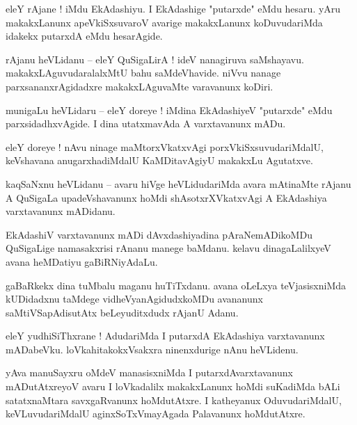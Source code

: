 \documentclass{article}
\begin{document}
\begin{mn}%
eleY rAjane ! iMdu EkAdashiyu. I EkAdashige "putarxde" eMdu hesaru. yAru makakxLanunx 
apeVkiSxsuvaroV avarige makakxLanunx koDuvudariMda idakekx putarxdA eMdu hesarAgide.
\end{mn}

\begin{mn}%
rAjanu heVLidanu -- eleY QuSigaLirA ! ideV nanagiruva saMshayavu. makakxLAguvudaralalxMtU bahu 
saMdeVhavide. niVvu nanage parxsananxrAgidadxre makakxLAguvaMte varavanunx koDiri.
\end{mn}

\begin{mn}%
munigaLu heVLidaru -- eleY doreye ! iMdina EkAdashiyeV "putarxde" eMdu parxsidadhxvAgide. I dina 
utatxmavAda A varxtavanunx mADu.
\end{mn}

\begin{mn}%
eleY doreye ! nAvu ninage maMtorxVkatxvAgi porxVkiSxsuvudariMdalU, keVshavana anugarxhadiMdalU 
KaMDitavAgiyU makakxLu Agutatxve.
\end{mn}

\begin{mn}%
kaqSaNxnu heVLidanu -- avaru hiVge heVLidudariMda avara mAtinaMte rAjanu A QuSigaLa upadeVshavanunx 
hoMdi shAsotxrXVkatxvAgi A EkAdashiya varxtavanunx mADidanu.
\end{mn}

\begin{mn}%
EkAdashiV varxtavanunx mADi dAvxdashiyadina pAraNemADikoMDu QuSigaLige namasakxrisi rAnanu manege 
baMdanu. kelavu dinagaLalilxyeV avana heMDatiyu gaBiRNiyAdaLu.
\end{mn}

\begin{mn}%
gaBaRkekx dina tuMbalu maganu huTiTxdanu. avana oLeLxya teVjasisxniMda kUDidadxnu taMdege 
vidheVyanAgidudxkoMDu avananunx saMtiVSapAdisutAtx beLeyuditxdudx rAjanU Adanu.
\end{mn}

\begin{mn}%
eleY yudhiSiThxrane ! AdudariMda I putarxdA EkAdashiya varxtavanunx mADabeVku. loVkahitakokxVsakxra 
ninenxdurige nAnu heVLidenu.
\end{mn}

\begin{mn}%
yAva manuSayxru oMdeV manasisxniMda I putarxdAvarxtavanunx mADutAtxreyoV avaru I loVkadalilx 
makakxLanunx hoMdi suKadiMda bALi satatxnaMtara savxgaRvanunx hoMdutAtxre. I katheyanux 
OduvudariMdalU, keVLuvudariMdalU aginxSoTxVmayAgada Palavanunx hoMdutAtxre.
\end{mn}
\end{document}
